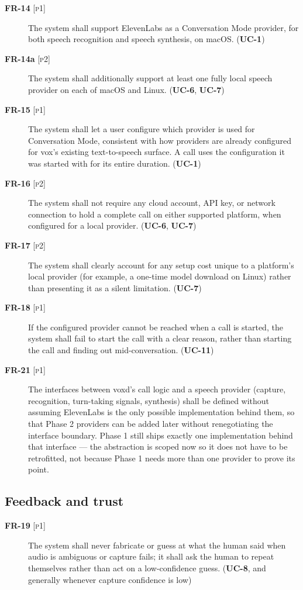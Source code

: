 \documentclass[a4paper,11pt]{report}
\newcommand{\uc}[1]{\textbf{UC-#1}}
\newcommand{\fr}[1]{\textbf{FR-#1}}
\newcommand{\pone}{\textsc{[p1]}}
\newcommand{\ptwo}{\textsc{[p2]}}
\begin{document}
\begin{description}
  \item[\fr{14} \pone{}] The system shall support ElevenLabs as a
    Conversation Mode provider, for both speech recognition and speech
    synthesis, on macOS. (\uc{1})
  \item[\fr{14a} \ptwo{}] The system shall additionally support at least
    one fully local speech provider on each of macOS and Linux. (\uc{6},
    \uc{7})
  \item[\fr{15} \pone{}] The system shall let a user configure which
    provider is used for Conversation Mode, consistent with how providers
    are already configured for vox's existing text-to-speech surface. A
    call uses the configuration it was started with for its entire
    duration. (\uc{1})
  \item[\fr{16} \ptwo{}] The system shall not require any cloud account,
    API key, or network connection to hold a complete call on either
    supported platform, when configured for a local provider. (\uc{6},
    \uc{7})
  \item[\fr{17} \ptwo{}] The system shall clearly account for any setup
    cost unique to a platform's local provider (for example, a one-time
    model download on Linux) rather than presenting it as a silent
    limitation. (\uc{7})
  \item[\fr{18} \pone{}] If the configured provider cannot be reached when
    a call is started, the system shall fail to start the call with a
    clear reason, rather than starting the call and finding out
    mid-conversation. (\uc{11})
  \item[\fr{21} \pone{}] The interfaces between voxd's call logic and a
    speech provider (capture, recognition, turn-taking signals, synthesis)
    shall be defined without assuming ElevenLabs is the only possible
    implementation behind them, so that Phase 2 providers can be added
    later without renegotiating the interface boundary. Phase 1 still
    ships exactly one implementation behind that interface --- the
    abstraction is scoped now so it does not have to be retrofitted, not
    because Phase 1 needs more than one provider to prove its point.
\end{description}

\subsection{Feedback and trust}

\begin{description}
  \item[\fr{19} \pone{}] The system shall never fabricate or guess at what
    the human said when audio is ambiguous or capture fails; it shall ask
    the human to repeat themselves rather than act on a low-confidence
    guess. (\uc{8}, and generally whenever capture confidence is low)
\end{description}
\end{document}
